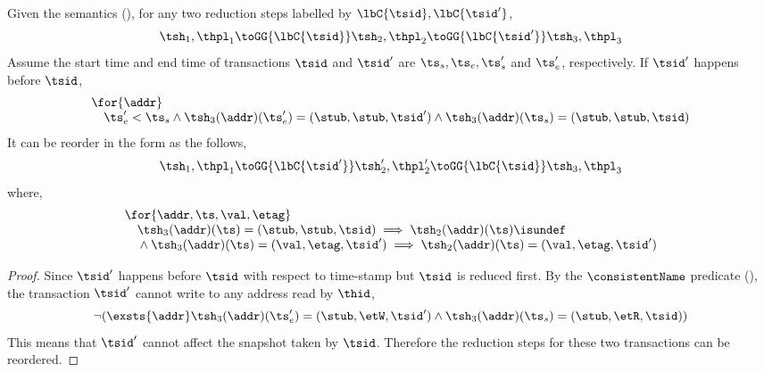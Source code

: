 \begin{lem}
\label{lem:reorder-the-future-and-past}
Given the semantics (), for any two reduction steps labelled by \( \lbC{\tsid}, \lbC{\tsid'} \),
\[
    \tsh_{1}, \thpl_{1} \toGG{\lbC{\tsid}} \tsh_{2}, \thpl_{2} \toGG{\lbC{\tsid'}} \tsh_{3}, \thpl_{3}
\]
Assume the start time and end time of transactions \( \tsid \) and \( \tsid' \) are \( \ts_{s}, \ts_{e}, \ts_{s}' \) and \( \ts_{e}' \), respectively.
If \( \tsid' \) happens before \( \tsid \), 
\[
\begin{array}{@{}l@{}}
    \for{\addr} \\
    \quad \ts_{e}' < \ts_{s}
    \land \tsh_{3}(\addr)(\ts_{e}') = (\stub, \stub, \tsid')
    \land \tsh_{3}(\addr)(\ts_{s}) = (\stub, \stub, \tsid)
\end{array}
\]
It can be reorder in the form as the follows,
\[
\begin{array}{@{}l@{}}
    \tsh_{1}, \thpl_{1} \toGG{\lbC{\tsid'}} \tsh_{2}', \thpl_{2}' \toGG{\lbC{\tsid}} \tsh_{3}, \thpl_{3}
\end{array}
\]
where,
\[
\begin{array}{@{}l@{}}
    \for{\addr, \ts,\val,\etag} \\
    \quad \tsh_{3}(\addr)(\ts) = (\stub, \stub, \tsid) \implies \tsh_{2}(\addr)(\ts) \isundef \\ 
    \quad {} \land \tsh_{3}(\addr)(\ts) = (\val, \etag, \tsid') \implies \tsh_{2}(\addr)(\ts) = (\val, \etag, \tsid')
\end{array}
\]
\end{lem}
\begin{proof}
Since \( \tsid' \)  happens before \( \tsid \)  with respect to time-stamp but \( \tsid \) is reduced first.
By the \( \consistentName \) predicate (), the transaction \( \tsid' \) cannot write to any address read by \( \thid \),
\[
    \neg(\exsts{\addr} \tsh_{3}(\addr)(\ts_{e}') = (\stub, \etW,\tsid') \land \tsh_{3}(\addr)(\ts_{s}) = (\stub, \etR,\tsid))
\]
This means that \( \tsid' \) cannot affect the snapshot taken by \( \tsid \).
Therefore the reduction steps for these two transactions can be reordered.
\end{proof}

